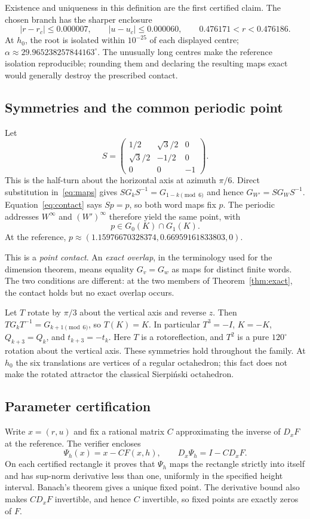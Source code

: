\documentclass[11pt,a4paper]{article}
\theoremstyle{definition}\newtheorem{definition}[theorem]{Definition}
\theoremstyle{remark}\newtheorem{remark}[theorem]{Remark}
\begin{document}
Existence and uniqueness in this definition are the first certified claim.
The chosen branch has the sharper enclosure
\begin{equation}\label{eq:box}
|r-r_c|\le0.000007,\qquad |u-u_c|\le0.000060,
\qquad 0.476171<r<0.476186.
\end{equation}
At $h_0$, the root is isolated within $10^{-25}$ of each displayed centre;
$\alpha\approx29.965238257844163^\circ$. The unusually long centres make the
reference isolation reproducible; rounding them and declaring the resulting
maps exact would generally destroy the prescribed contact.

\subsection{Symmetries and the common periodic point}
Let
\[
S=\begin{pmatrix}1/2&\sqrt3/2&0\\\sqrt3/2&-1/2&0\\0&0&-1\end{pmatrix}.
\]
This is the half-turn about the horizontal axis at azimuth $\pi/6$.
Direct substitution in~\eqref{eq:maps} gives
$SG_kS^{-1}=G_{1-k\pmod6}$ and hence $G_{W'}=SG_WS^{-1}$.
Equation~\eqref{eq:contact} says $Sp=p$, so both word maps fix $p$.
The periodic addresses $W^\infty$ and $(W')^\infty$ therefore yield the same
point, with
\[
p\in G_0(K)\cap G_1(K).
\]
At the reference, $p\approx(1.15976670328374,0.66959161833803,0)$.

This is a \emph{point contact}. An \emph{exact overlap}, in the terminology
used for the dimension theorem, means equality $G_v=G_w$ as maps for
distinct finite words. The two conditions are different: at the two members
of Theorem~\ref{thm:exact}, the contact holds but no exact overlap occurs.

Let $T$ rotate by $\pi/3$ about the vertical axis and reverse $z$.
Then $TG_kT^{-1}=G_{k+1\pmod6}$, so $T(K)=K$. In particular $T^3=-I$,
$K=-K$, $Q_{k+3}=Q_k$, and $t_{k+3}=-t_k$.
Here $T$ is a rotoreflection, and $T^2$ is a pure $120^\circ$ rotation about
the vertical axis. These symmetries hold throughout the family. At $h_0$ the six translations
are vertices of a regular octahedron; this fact does not make the rotated
attractor the classical Sierpi\'nski octahedron.

\subsection{Parameter certification}
Write $x=(r,u)$ and fix a rational matrix $C$ approximating the inverse of
$D_xF$ at the reference. The verifier encloses
\[
\Psi_h(x)=x-CF(x,h),\qquad D_x\Psi_h=I-CD_xF.
\]
On each certified rectangle it proves that $\Psi_h$ maps the rectangle strictly
into itself and has sup-norm derivative less than one, uniformly in the
specified height interval. Banach's theorem gives a unique fixed point.
The derivative bound also makes $CD_xF$ invertible, and hence $C$ invertible,
so fixed points are exactly zeros of $F$.
\end{document}
